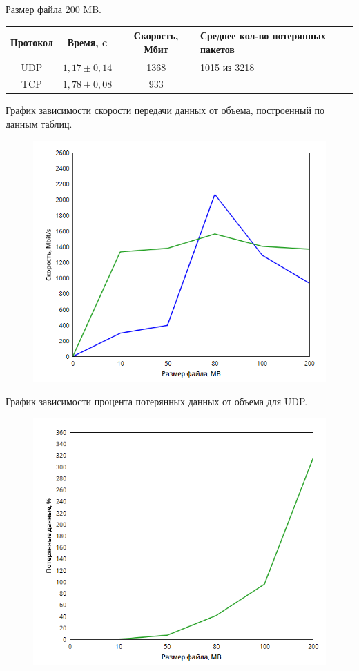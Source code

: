 \documentclass{article}
\begin{document}
Размер файла 200 MB.

\begin{table}[h!]
\begin{tabular}{|c|c|c|p{130pt}|}
\hline
Протокол & Время, c & Скорость, Мбит & Среднее кол-во потерянных пакетов \\
\hline
UDP & $1,17 \pm 0,14$ & 1368 & 1015 из 3218\\
TCP & $1,78 \pm 0,08$ & 933 &  \\
\hline
\end{tabular}
\end{table}

\newpage

График зависимости скорости передачи данных от объема, построенный по данным таблиц.

\begin{figure}[h]
\includegraphics[scale=0.7]{6}
\end{figure}

График зависимости процента потерянных данных от объема для UDP.

\begin{figure}[h!]
\includegraphics[scale=0.7]{7}
\end{figure}
\end{document}
